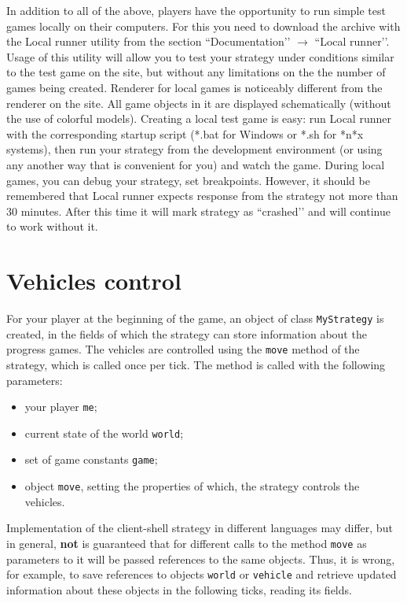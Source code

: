In addition to all of the above, players have the opportunity to run simple test games locally on their computers. For this
you need to download the archive with the Local runner utility from the section ``Documentation’’ $\rightarrow $ ``Local runner’’. Usage of this
utility will allow you to test your strategy under conditions similar to the test game on the site, but without any limitations on the
the number of games being created. Renderer for local games is noticeably different from the renderer on the site. 
All game objects in it are displayed
schematically (without the use of colorful models). Creating a local test game is easy: run Local runner with
the corresponding startup script (*.bat for Windows or *.sh for *n*x systems), then run your strategy from the development environment (or using any another way that is convenient for you) and watch the game. During local games, you can debug your strategy, set breakpoints.
However, it should be remembered that Local runner expects response from the strategy not more than $30$ minutes. After this time it will mark
strategy as ``crashed’’ and will continue to work without it.

\section{Vehicles control}

For your player at the beginning of the game, an object of class \texttt{MyStrategy} is created, in the fields of which the strategy can store information about the progress
games. The vehicles are controlled using the \texttt{move} method of the strategy, which is called once per tick. The method is called
with the following parameters:
\begin{itemize}
  \item your player \texttt{me};
  \item current state of the world \texttt{world};
  \item set of game constants \texttt{game};
  \item object \texttt{move}, setting the properties of which, the strategy controls the vehicles.
\end{itemize}

 Implementation of the client-shell strategy in different languages may differ, but in general, \textbf{not} is guaranteed that for different
calls to the method \texttt {move} as parameters to it will be passed references to the same objects. Thus, it is wrong, for example,
to save references to objects \texttt{world} or \texttt{vehicle} and retrieve updated information about these objects in the following ticks, reading
its fields.

